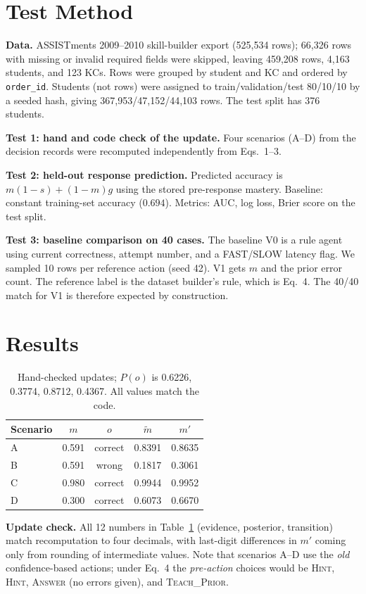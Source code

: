 \documentclass[10pt,twocolumn,letterpaper]{article}
\begin{document}
\section{Test Method}
\textbf{Data.} ASSISTments 2009--2010 skill-builder export (525{,}534 rows); 66{,}326 rows with missing or invalid required fields were skipped, leaving 459{,}208 rows, 4{,}163 students, and 123 KCs. Rows were grouped by student and KC and ordered by \texttt{order\_id}. Students (not rows) were assigned to train/validation/test 80/10/10 by a seeded hash, giving 367{,}953/47{,}152/44{,}103 rows. The test split has 376 students.

\textbf{Test 1: hand and code check of the update.} Four scenarios (A--D) from the decision records were recomputed independently from Eqs.~1--3.

\textbf{Test 2: held-out response prediction.} Predicted accuracy is $m(1-s)+(1-m)g$ using the stored pre-response mastery. Baseline: constant training-set accuracy ($0.694$). Metrics: AUC, log loss, Brier score on the test split.

\textbf{Test 3: baseline comparison on 40 cases.} The baseline V0 is a rule agent using current correctness, attempt number, and a FAST/SLOW latency flag. We sampled 10 rows per reference action (seed 42). V1 gets $m$ and the prior error count. The reference label is the dataset builder's rule, which is Eq.~4. The 40/40 match for V1 is therefore expected by construction.

\section{Results}
\begin{table}[t]\centering\small
\begin{tabular}{@{}lcccc@{}}\toprule
Scenario & $m$ & $o$ & $\tilde m$ & $m'$\\\midrule
A & 0.591 & correct & 0.8391 & 0.8635\\
B & 0.591 & wrong & 0.1817 & 0.3061\\
C & 0.980 & correct & 0.9944 & 0.9952\\
D & 0.300 & correct & 0.6073 & 0.6670\\\bottomrule
\end{tabular}
\caption{Hand-checked updates; $P(o)$ is 0.6226, 0.3774, 0.8712, 0.4367. All values match the code.}\label{tab:upd}
\end{table}

\textbf{Update check.} All 12 numbers in Table~\ref{tab:upd} (evidence, posterior, transition) match recomputation to four decimals, with last-digit differences in $m'$ coming only from rounding of intermediate values. Note that scenarios A--D use the \emph{old} confidence-based actions; under Eq.~4 the \emph{pre-action} choices would be \textsc{Hint}, \textsc{Hint}, \textsc{Answer} (no errors given), and \textsc{Teach\_Prior}.
\end{document}
